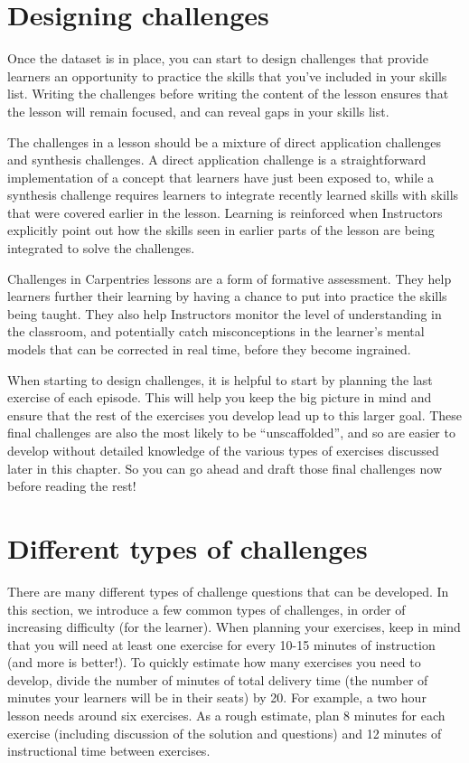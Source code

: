 \documentclass[]{book}
\begin{document}
\hypertarget{designing-challenges-1}{%
\section{Designing challenges}\label{designing-challenges-1}}

Once the dataset is in place, you can start to
design challenges that provide learners an opportunity to practice the skills that you've
included in your skills list. Writing the challenges before writing the content of the lesson ensures that the
lesson will remain focused, and can reveal gaps in your skills list.

The challenges in a lesson should be a mixture of direct application challenges and synthesis
challenges. A direct application challenge is a straightforward implementation of a concept
that learners have just been exposed to, while a synthesis challenge requires learners to
integrate recently learned skills with skills that were covered earlier in
the lesson. Learning is reinforced when Instructors explicitly point out how the skills seen in
earlier parts of the lesson are being integrated to solve the challenges.

Challenges in Carpentries lessons are a form of formative assessment. They help learners further
their learning by having a chance to put into practice the skills being taught. They also help
Instructors monitor the level of understanding in the classroom, and potentially catch
misconceptions in the learner's mental models that can be corrected in real time, before they
become ingrained.

When starting to design challenges, it is helpful to start by planning the last exercise of each
episode. This will help you keep the big picture in mind and ensure that the rest of the
exercises you develop lead up to this larger goal. These final challenges are also
the most likely to be ``unscaffolded'', and so are easier to develop without detailed
knowledge of the various types of exercises discussed later in this chapter. So you
can go ahead and draft those final challenges now before reading the rest!

\hypertarget{different-types-of-challenges}{%
\section{Different types of challenges}\label{different-types-of-challenges}}

There are many different types of challenge questions that can be developed. In this
section, we introduce a few common types of challenges, in order of increasing
difficulty (for the learner). When planning your exercises, keep in mind that you will
need at least one exercise for every 10-15 minutes of instruction (and more is better!).
To quickly estimate how many exercises you need to develop, divide the number of
minutes of total delivery time (the number of minutes your learners will be in their
seats) by 20. For example, a two hour lesson needs around six exercises.
As a rough estimate, plan 8 minutes for each exercise
(including discussion of the solution and questions) and 12 minutes of instructional time
between exercises.
\end{document}
